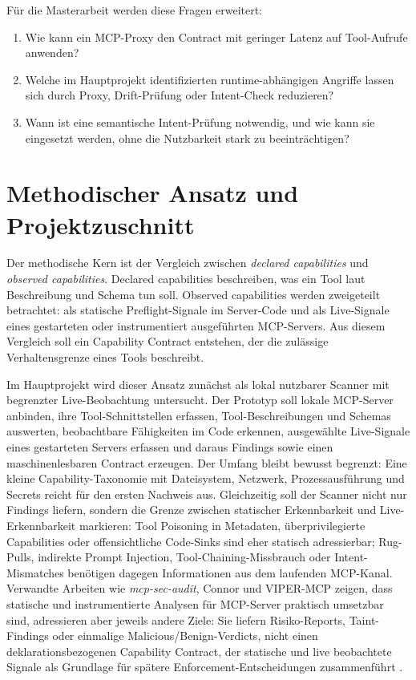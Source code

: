 \documentclass[pdflatex,sn-mathphys-num]{sn-jnl}%
\theoremstyle{thmstyleone}%
\theoremstyle{thmstyletwo}%
\theoremstyle{thmstylethree}%
\begin{document}
F\"ur die Masterarbeit werden diese Fragen erweitert:

\begin{enumerate}
\item Wie kann ein MCP-Proxy den Contract mit geringer Latenz auf Tool-Aufrufe anwenden?
\item Welche im Hauptprojekt identifizierten runtime-abh\"angigen Angriffe lassen sich durch Proxy, Drift-Pr\"ufung oder Intent-Check reduzieren?
\item Wann ist eine semantische Intent-Pr\"ufung notwendig, und wie kann sie eingesetzt werden, ohne die Nutzbarkeit stark zu beeintr\"achtigen?
\end{enumerate}

\section{Methodischer Ansatz und Projektzuschnitt}\label{sec:method}

Der methodische Kern ist der Vergleich zwischen \emph{declared capabilities} und \emph{observed capabilities}. Declared capabilities beschreiben, was ein Tool laut Beschreibung und Schema tun soll. Observed capabilities werden zweigeteilt betrachtet: als statische Preflight-Signale im Server-Code und als Live-Signale eines gestarteten oder instrumentiert ausgef\"uhrten MCP-Servers. Aus diesem Vergleich soll ein Capability Contract entstehen, der die zul\"assige Verhaltensgrenze eines Tools beschreibt.

Im Hauptprojekt wird dieser Ansatz zun\"achst als lokal nutzbarer Scanner mit begrenzter Live-Beobachtung untersucht. Der Prototyp soll lokale MCP-Server anbinden, ihre Tool-Schnittstellen erfassen, Tool-Beschreibungen und Schemas auswerten, beobachtbare F\"ahigkeiten im Code erkennen, ausgew\"ahlte Live-Signale eines gestarteten Servers erfassen und daraus Findings sowie einen maschinenlesbaren Contract erzeugen. Der Umfang bleibt bewusst begrenzt: Eine kleine Capability-Taxonomie mit Dateisystem, Netzwerk, Prozessausf\"uhrung und Secrets reicht f\"ur den ersten Nachweis aus. Gleichzeitig soll der Scanner nicht nur Findings liefern, sondern die Grenze zwischen statischer Erkennbarkeit und Live-Erkennbarkeit markieren: Tool Poisoning in Metadaten, \"uberprivilegierte Capabilities oder offensichtliche Code-Sinks sind eher statisch adressierbar; Rug-Pulls, indirekte Prompt Injection, Tool-Chaining-Missbrauch oder Intent-Mismatches ben\"otigen dagegen Informationen aus dem laufenden MCP-Kanal. Verwandte Arbeiten wie \emph{mcp-sec-audit}, Connor und VIPER-MCP zeigen, dass statische und instrumentierte Analysen f\"ur MCP-Server praktisch umsetzbar sind, adressieren aber jeweils andere Ziele: Sie liefern Risiko-Reports, Taint-Findings oder einmalige Malicious/Benign-Verdicts, nicht einen deklarationsbezogenen Capability Contract, der statische und live beobachtete Signale als Grundlage f\"ur sp\"atere Enforcement-Entscheidungen zusammenf\"uhrt \cite{mcpaudit2026,connor2026,viper2026}.
\end{document}
